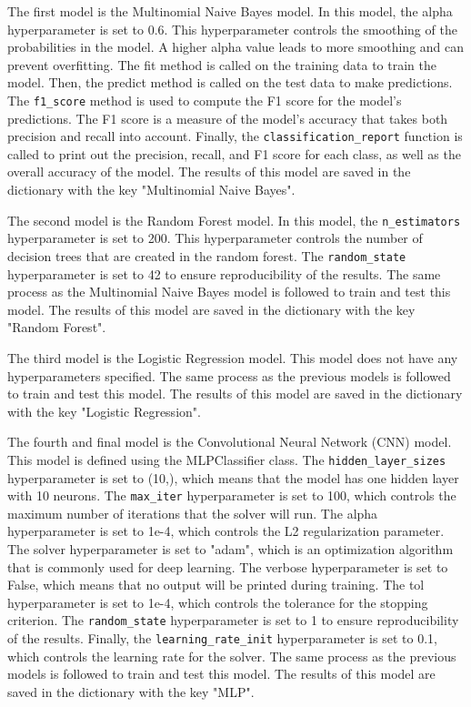 \documentclass[11pt]{diazessay} %
\begin{document}
The first model is the Multinomial Naive Bayes model. In this model, the alpha hyperparameter is set to 0.6. This hyperparameter controls the smoothing of the probabilities in the model. A higher alpha value leads to more smoothing and can prevent overfitting. The fit method is called on the training data to train the model. Then, the predict method is called on the test data to make predictions. The \verb|f1_score| method is used to compute the F1 score for the model's predictions. The F1 score is a measure of the model's accuracy that takes both precision and recall into account. Finally, the \verb|classification_report| function is called to print out the precision, recall, and F1 score for each class, as well as the overall accuracy of the model. The results of this model are saved in the dictionary with the key "Multinomial Naive Bayes".

The second model is the Random Forest model. In this model, the \verb|n_estimators| hyperparameter is set to 200. This hyperparameter controls the number of decision trees that are created in the random forest. The \verb|random_state| hyperparameter is set to 42 to ensure reproducibility of the results. The same process as the Multinomial Naive Bayes model is followed to train and test this model. The results of this model are saved in the dictionary with the key "Random Forest".

The third model is the Logistic Regression model. This model does not have any hyperparameters specified. The same process as the previous models is followed to train and test this model. The results of this model are saved in the dictionary with the key "Logistic Regression".

The fourth and final model is the Convolutional Neural Network (CNN) model. This model is defined using the MLPClassifier class. The \verb|hidden_layer_sizes| hyperparameter is set to (10,), which means that the model has one hidden layer with 10 neurons. The \verb|max_iter| hyperparameter is set to 100, which controls the maximum number of iterations that the solver will run. The alpha hyperparameter is set to 1e-4, which controls the L2 regularization parameter. The solver hyperparameter is set to "adam", which is an optimization algorithm that is commonly used for deep learning. The verbose hyperparameter is set to False, which means that no output will be printed during training. The tol hyperparameter is set to 1e-4, which controls the tolerance for the stopping criterion. The \verb|random_state| hyperparameter is set to 1 to ensure reproducibility of the results. Finally, the \verb|learning_rate_init| hyperparameter is set to 0.1, which controls the learning rate for the solver. The same process as the previous models is followed to train and test this model. The results of this model are saved in the dictionary with the key "MLP".
\end{document}
